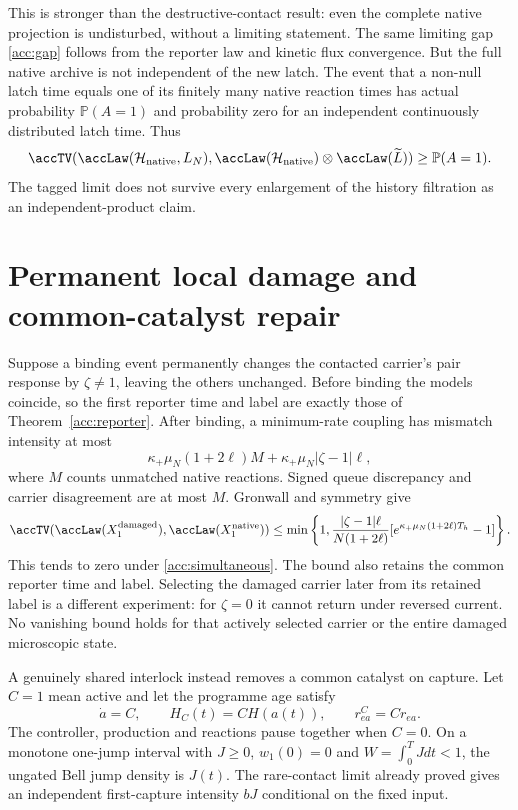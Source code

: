 \documentclass[11pt,oneside,openany]{book}
\theoremstyle{definition}
\theoremstyle{remark}\newtheorem{remark}[theorem]{Remark}
\begin{document}
This is stronger than the destructive-contact result: even the complete
native projection is undisturbed, without a limiting statement. The same
limiting gap \eqref{acc:gap} follows from the reporter law and kinetic flux
convergence. But the full native archive is not independent of the new
latch. The event that a non-null latch time equals one of its finitely
many native reaction times has actual probability $\mathbb P(A=1)$ and
probability zero for an independent continuously distributed latch time.
Thus
\begin{equation}
 \accTV(\accLaw(\mathcal H_{
\rm native},L_N),
 \accLaw(\mathcal H_{
\rm native})\otimes\accLaw(\widetilde L))
 \ge\mathbb P(A=1).
 \label{acc:fullhistoryfloor}
\end{equation}
The tagged limit does not survive every enlargement of the history
filtration as an independent-product claim.

\section{Permanent local damage and common-catalyst repair}
Suppose a binding event permanently changes the contacted carrier's pair
response by $\zeta\ne1$, leaving the others unchanged. Before binding the
models coincide, so the first reporter time and label are exactly those
of Theorem~\ref{acc:reporter}. After binding, a minimum-rate coupling has
mismatch intensity at most
\[
 \kappa_+\mu_N(1+2\ell)M+
 \kappa_+\mu_N|\zeta-1|\ell,
\]
where $M$ counts unmatched native reactions. Signed queue discrepancy and
carrier disagreement are at most $M$. Gronwall and symmetry give
\begin{equation}
 \accTV(\accLaw(X_1^{\rm damaged}),\accLaw(X_1^{\rm native}))
 \le\min\left\{1,
 \frac{|\zeta-1|\ell}{N(1+2\ell)}
 [e^{\kappa_+\mu_N(1+2\ell)T_h}-1]\right\}.
 \label{acc:damage}
\end{equation}
This tends to zero under \eqref{acc:simultaneous}. The bound also retains
the common reporter time and label. Selecting the damaged carrier later
from its retained label is a different experiment: for $\zeta=0$ it
cannot return under reversed current. No vanishing bound holds for that
actively selected carrier or the entire damaged microscopic state.

A genuinely shared interlock instead removes a common catalyst on capture.
Let $C=1$ mean active and let the programme age satisfy
\begin{equation}
 \dot a=C,\qquad H_C(t)=C H(a(t)),\qquad r_{ea}^C=C r_{ea}.
 \label{acc:gate}
\end{equation}
The controller, production and reactions pause together when $C=0$.
On a monotone one-jump interval with $J\ge0$, $w_1(0)=0$ and
$W=\int_0^TJdt<1$, the ungated Bell jump density is $J(t)$.
The rare-contact limit already proved gives an independent first-capture
intensity $bJ$ conditional on the fixed input.
\end{document}
